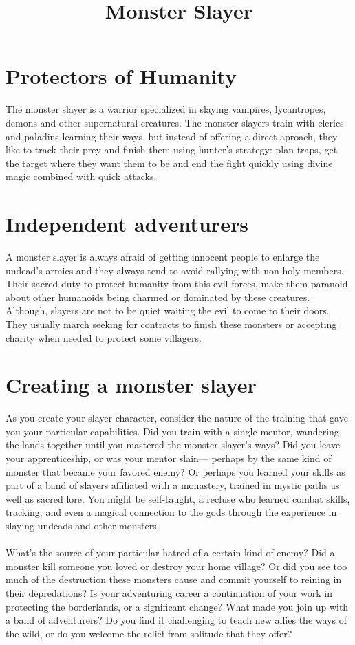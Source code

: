 \documentclass[11pt,a4paper,twocolumn, sans]{article}
\title{Monster Slayer}
\author{}
\date{}
\begin{document}
	\maketitle
	\section*{Protectors of Humanity}
	The monster slayer is a warrior specialized in slaying vampires, lycantropes, demons and other supernatural creatures. The monster slayers train with clerics and paladins	learning their ways, but instead of offering a direct aproach, they like to track their prey and finish them using hunter's strategy: plan traps, get the target where they want them to be and 	end the fight quickly using divine magic combined with quick attacks.
	\section*{Independent adventurers}
	A monster slayer is always afraid of getting innocent people to enlarge the undead's armies and they always tend to avoid rallying with non holy members. Their sacred duty to protect humanity from this evil forces, make them paranoid about	other humanoids being charmed or dominated by these creatures. \\
	Although, slayers are not to be quiet waiting the evil to come to their doors. They usually	march seeking for contracts to finish these monsters or accepting charity when needed to protect some villagers.
	\section*{Creating a monster slayer}
	As you create your slayer character, consider the nature of the training that gave you your particular capabilities. Did you train with a single mentor, wandering the lands together until you mastered the monster slayer’s ways? Did you leave your apprenticeship, or was your mentor slain— perhaps by the same kind of monster that became your favored enemy? Or perhaps you learned your skills as part of a band of slayers affiliated with a monastery, trained in mystic paths as well as sacred lore. You might be self-taught, a recluse who learned combat skills, tracking, and even a magical connection to the gods through the experience in slaying undeads and other monsters. \\ \\
	What’s the source of your particular hatred of a certain kind of enemy? Did a monster kill someone you loved or destroy your home village? Or did you see too much of the destruction these monsters cause and commit yourself to reining in their depredations? Is your adventuring career a continuation of your work in protecting the borderlands, or a significant change? What made you join up with a band of adventurers? Do you find it challenging to teach new allies the ways of the wild, or do you welcome the relief from solitude that they offer?
\end{document}

